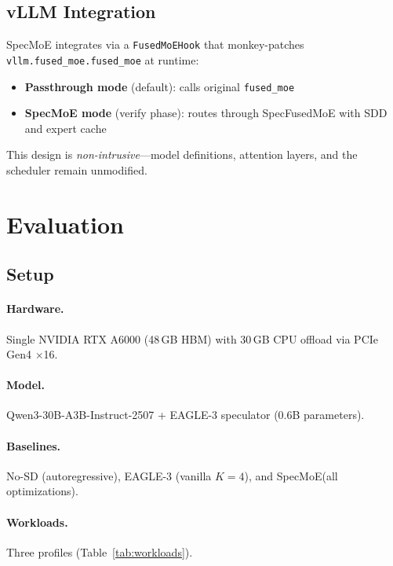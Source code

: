 \documentclass[letterpaper,twocolumn,10pt]{article}
\newcommand{\sysname}{SpecMoE\xspace}
\newcommand{\specfused}{SpecFusedMoE\xspace}
\newcommand{\sdd}{SDD\xspace}
\begin{document}
\subsection{vLLM Integration}\label{sec:integration}

\sysname integrates via a \texttt{FusedMoEHook} that monkey-patches
\texttt{vllm.fused\_moe.fused\_moe} at runtime:

\begin{itemize}[leftmargin=*,itemsep=1pt]
\item \textbf{Passthrough mode} (default): calls original \texttt{fused\_moe}
\item \textbf{\sysname mode} (verify phase): routes through \specfused
  with \sdd and expert cache
\end{itemize}

This design is \emph{non-intrusive}---model definitions, attention layers,
and the scheduler remain unmodified.

\section{Evaluation}\label{sec:eval}

\subsection{Setup}

\paragraph{Hardware.}  Single NVIDIA RTX A6000 (48\,GB HBM) with 30\,GB
CPU offload via PCIe Gen4 $\times$16.

\paragraph{Model.}  Qwen3-30B-A3B-Instruct-2507 + EAGLE-3 speculator
(0.6B parameters).

\paragraph{Baselines.}  No-SD (autoregressive), EAGLE-3 (vanilla $K\!=\!4$),
and \sysname (all optimizations).

\paragraph{Workloads.}  Three profiles (Table~\ref{tab:workloads}).
\end{document}
